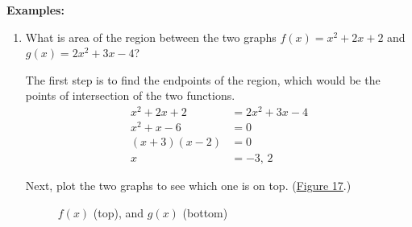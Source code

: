 \documentclass[12pt]{article}
\begin{document}
                \noindent \textbf{Examples:}
                \begin{enumerate}
                    \item What is area of the region between the two graphs $f(x) = x^2 + 2x + 2$ and $g(x) = 2x^2 + 3x - 4$?

                    The first step is to find the endpoints of the region, which would be the points of intersection of the two functions.
                    \begin{align*}
                        x^2 + 2x + 2 &= 2x^2 + 3x - 4 \\
                        x^2 + x - 6 &= 0 \\
                        (x+3)(x-2) &= 0 \\
                        x &= -3, \, 2
                    \end{align*}

                    Next, plot the two graphs to see which one is on top. (\hyperref[fig:abcx1]{Figure 17}.)

                    \begin{figure}[H]
                        \begin{center}
                            \caption{$f(x)$ (top), and $g(x)$ (bottom)}
                            \label{fig:abcx1}
                        \end{center}
                    \end{figure}


\end{enumerate}
\end{document}
